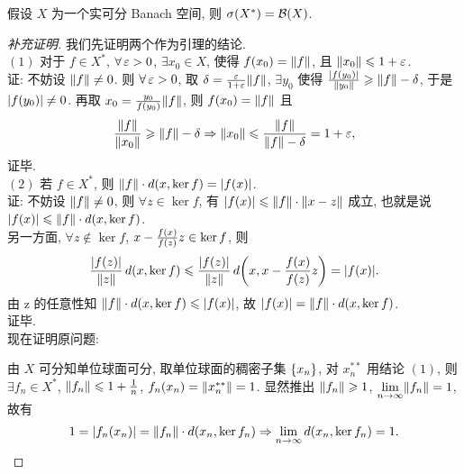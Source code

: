 \begin{lemma}
假设 $X$ 为一个实可分 Banach 空间, 则 $\sigma\xk{X^*}=\mathcal{B}\xk{X}$.
\end{lemma}
\begin{proof}[补充证明]
我们先证明两个作为引理的结论.\\
$(1)$ 对于 $f\in X^*$, $\forall\eps>0$, $\exists x_0\in X$, 使得 $f\xk{x_0}=\fs{f}$, 且 $\left\Vert x_0\right\Vert\leqslant 1+\operatorname{\varepsilon}$.\\
证: 不妨设 $\left\Vert f\right\Vert\neq 0$. 则 $\forall\eps>0$, 取 $\delta=\frac{\eps}{1+\eps}\fs{f}$, $\exists y_0$ 使得 $\frac{\left\vert f\left(y_0\right)\right\vert}{\left\Vert y_0\right\Vert}\geqslant \left\Vert f\right\Vert-\delta$, 于是 $\jd{f\xk{y_0}}\neq0$. 再取 $x_0=\frac{y_0}{f\xk{y_0}}\fs{f}$, 则 $f\xk{x_0}=\fs{f}$ 且
\[\frac{\left\Vert f\right\Vert}{\left\Vert x_0\right\Vert}\geqslant\left\Vert f\right\Vert-\delta\Rightarrow\left\Vert x_0\right\Vert\leqslant\frac{\left\Vert f\right\Vert}{\left\Vert f\right\Vert-\delta}=1+\operatorname{\varepsilon},\]
证毕.\\
$(2)$ 若 $f\in X^*$, 则 $\fs{f}\cdot d\xk{x,\ker f}=\jd{f\xk{x}}$.\\
证: 不妨设 $\left\Vert f\right\Vert\neq 0$, 则 $\forall z\in\ker f$, 有 $\jd{f\xk{x}}\leq\fs{f}\cdot\fs{x-z}$ 成立, 也就是说\\
$\jd{f\xk{x}}\leq\fs{f}\cdot d\xk{x,\ker f}$.\\
另一方面, $\forall z\notin\ker f$, $x-\frac{f\left(x\right)}{f\left(z\right)}z\in\ker f$, 则
\[\frac{\jd{f\xk{z}}}{\fs{z}}\,d\xk{x,\ker f}\leq\frac{\jd{f\xk{z}}}{\fs{z}}\,d\xk{x,x-\frac{f\xk{x}}{f\xk{z}}z}=\jd{f\xk{x}}.\]
由 z 的任意性知 $\fs{f}\cdot d\xk{x,\ker f}\leq\jd{f\xk{x}}$, 故 $\jd{f\xk{x}}=\fs{f}\cdot d\xk{x,\ker f}$.\\
证毕.\\
现在证明原问题:\par
由 $X$ 可分知单位球面可分, 取单位球面的稠密子集 $\left\{x_n\right\}$, 对 $x_n^{**}$ 用结论 $(1)$, 则 $\exists f_n\in X^*$, $\left\Vert f_n\right\Vert\leqslant 1+\frac{1}{n}$, $f_n\xk{x_n}=\fs{x_n^{**}}=1$. 显然推出 $\left\Vert f_n\right\Vert\geqslant 1$, $\lim\limits_{n\toi}\fs{f_n}=1$, 故有
\[1=\jd{f_n\xk{x_n}}=\fs{f_n}\cdot d\xk{x_n,\ker f_n}\Rightarrow \lim _{n\toi}d\xk{x_n,\ker f_n}=1.\]


\end{proof}

